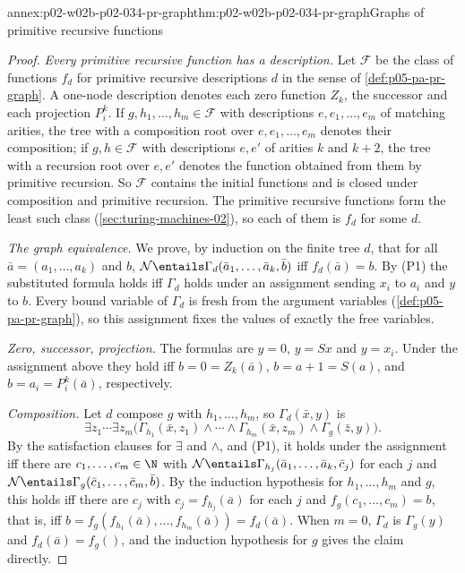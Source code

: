 \begin{annexitem}{annex:p02-w02b-p02-034-pr-graph}{thm:p02-w02b-p02-034-pr-graph}{Graphs of primitive recursive functions}
\begin{proof}
\emph{Every primitive recursive function has a description.}  Let
\(\mathcal F\) be the class of functions \(f_d\) for primitive recursive
descriptions \(d\) in the sense of \cref{def:p05-pa-pr-graph}.  A one-node
description denotes each zero function \(Z_k\), the successor and each
projection \(P^k_i\).  If \(g,h_1,\ldots,h_m\in\mathcal F\) with descriptions
\(e,e_1,\ldots,e_m\) of matching arities, the tree with a composition root
over \(e,e_1,\ldots,e_m\) denotes their composition; if \(g,h\in\mathcal F\)
with descriptions \(e,e'\) of arities \(k\) and \(k+2\), the tree with a
recursion root over \(e,e'\) denotes the function obtained from them by
primitive recursion.  So \(\mathcal F\) contains the initial functions and
is closed under composition and primitive recursion.  The primitive
recursive functions form the least such class (\cref{sec:turing-machines-02}),
so each of them is \(f_d\) for some \(d\).

\emph{The graph equivalence.}  We prove, by induction on the finite tree
\(d\), that for all \(\bar a=(a_1,\ldots,a_k)\) and \(b\),
\(\mathcal N\entails\Gamma_d(\bar a_1,\ldots,\bar a_k,\bar b)\) iff
\(f_d(\bar a)=b\).  By (P1) the substituted formula holds iff \(\Gamma_d\)
holds under an assignment sending \(x_i\) to \(a_i\) and \(y\) to \(b\).
Every bound variable of \(\Gamma_d\) is fresh from the argument variables
(\cref{def:p05-pa-pr-graph}), so this assignment fixes the values of exactly
the free variables.

\emph{Zero, successor, projection.}  The formulas are \(y=0\), \(y=Sx\) and
\(y=x_i\).  Under the assignment above they hold iff \(b=0=Z_k(\bar a)\),
\(b=a+1=S(a)\), and \(b=a_i=P^k_i(\bar a)\), respectively.

\emph{Composition.}  Let \(d\) compose \(g\) with \(h_1,\ldots,h_m\), so
\(\Gamma_d(\bar x,y)\) is
\[
 \exists z_1\cdots\exists z_m\bigl(\Gamma_{h_1}(\bar x,z_1)\land\cdots\land
 \Gamma_{h_m}(\bar x,z_m)\land\Gamma_g(\bar z,y)\bigr).
\]
By the satisfaction clauses for \(\exists\) and \(\land\), and (P1), it holds
under the assignment iff there are \(c_1,\ldots,c_m\in\N\) with
\(\mathcal N\entails\Gamma_{h_j}(\bar a_1,\ldots,\bar a_k,\bar c_j)\) for each
\(j\) and \(\mathcal N\entails\Gamma_g(\bar c_1,\ldots,\bar c_m,\bar b)\).  By
the induction hypothesis for \(h_1,\ldots,h_m\) and \(g\), this holds iff
there are \(c_j\) with \(c_j=f_{h_j}(\bar a)\) for each \(j\) and
\(f_g(c_1,\ldots,c_m)=b\), that is, iff
\(b=f_g(f_{h_1}(\bar a),\ldots,f_{h_m}(\bar a))=f_d(\bar a)\).  When
\(m=0\), \(\Gamma_d\) is \(\Gamma_g(y)\) and \(f_d(\bar a)=f_g()\), and the
induction hypothesis for \(g\) gives the claim directly.


\end{proof}
\end{annexitem}
